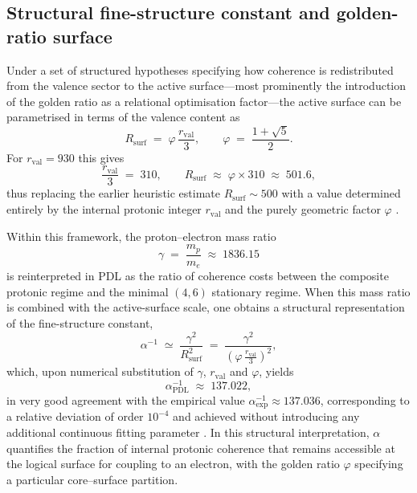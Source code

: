 \documentclass[11pt,a4paper]{article}
\numberwithin{equation}{section}
\begin{document}
\subsection{Structural fine-structure constant and golden-ratio surface}
\label{subsec:alpha_structural}

Under a set of structured hypotheses specifying how coherence is redistributed from the valence sector to the active surface—most prominently the introduction of the golden ratio as a relational optimisation factor—the active surface can be parametrised in terms of the valence content as \cite{LaubscherDerivationAlpha2026,LaubscherGoldenRatioPDL2026}
\begin{equation}
  R_{\mathrm{surf}} \;=\; \varphi\,\frac{r_{\mathrm{val}}}{3},
  \qquad
  \varphi \;=\; \frac{1+\sqrt{5}}{2}.
\end{equation}
For $r_{\mathrm{val}} = 930$ this gives
\begin{equation}
  \frac{r_{\mathrm{val}}}{3} \;=\; 310,
  \qquad
  R_{\mathrm{surf}} \;\approx\; \varphi \times 310 \;\approx\; 501.6,
\end{equation}
thus replacing the earlier heuristic estimate $R_{\mathrm{surf}}\sim 500$ with a value determined entirely by the internal protonic integer $r_{\mathrm{val}}$ and the purely geometric factor $\varphi$ \cite{LaubscherGoldenRatioPDL2026}.

Within this framework, the proton–electron mass ratio
\begin{equation}
  \gamma \;=\; \frac{m_p}{m_e} \;\approx\; 1836.15
\end{equation}
is reinterpreted in PDL as the ratio of coherence costs between the composite protonic regime and the minimal $(4,6)$ stationary regime. When this mass ratio is combined with the active-surface scale, one obtains a structural representation of the fine-structure constant,
\begin{equation}
  \alpha^{-1} \;\simeq\; \frac{\gamma^2}{R_{\mathrm{surf}}^2}
  \;=\; \frac{\gamma^2}{\left(\varphi\,\frac{r_{\mathrm{val}}}{3}\right)^2},
\end{equation}
which, upon numerical substitution of $\gamma$, $r_{\mathrm{val}}$ and $\varphi$, yields
\begin{equation}
  \alpha^{-1}_{\mathrm{PDL}} \;\approx\; 137.022,
\end{equation}
in very good agreement with the empirical value $\alpha^{-1}_{\mathrm{exp}}\approx 137.036$, corresponding to a relative deviation of order $10^{-4}$ and achieved without introducing any additional continuous fitting parameter \cite{LaubscherDerivationAlpha2026}. In this structural interpretation, $\alpha$ quantifies the fraction of internal protonic coherence that remains accessible at the logical surface for coupling to an electron, with the golden ratio $\varphi$ specifying a particular core–surface partition.
\end{document}
